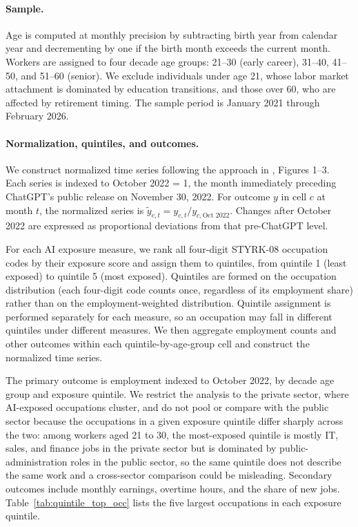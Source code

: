 \documentclass[12pt]{article}
\begin{document}
\paragraph{Sample.}
Age is computed at monthly precision by subtracting birth year from calendar year and decrementing by one if the birth month exceeds the current month. Workers are assigned to four decade age groups: 21--30 (early career), 31--40, 41--50, and 51--60 (senior). We exclude individuals under age 21, whose labor market attachment is dominated by education transitions, and those over 60, who are affected by retirement timing. The sample period is January 2021 through February 2026.

\paragraph{Normalization, quintiles, and outcomes.}\label{sec:data:approach}

We construct normalized time series following the approach in \citet{brynjolfsson2025}, Figures 1--3. Each series is indexed to October 2022 = 1, the month immediately preceding ChatGPT's public release on November 30, 2022. For outcome $y$ in cell $c$ at month $t$, the normalized series is $\tilde{y}_{c,t} = y_{c,t} / y_{c,\text{Oct } 2022}$. Changes after October 2022 are expressed as proportional deviations from that pre-ChatGPT level.

For each AI exposure measure, we rank all four-digit STYRK-08 occupation codes by their exposure score and assign them to quintiles, from quintile 1 (least exposed) to quintile 5 (most exposed). Quintiles are formed on the occupation distribution (each four-digit code counts once, regardless of its employment share) rather than on the employment-weighted distribution. Quintile assignment is performed separately for each measure, so an occupation may fall in different quintiles under different measures. We then aggregate employment counts and other outcomes within each quintile-by-age-group cell and construct the normalized time series.

The primary outcome is employment indexed to October 2022, by decade age group and exposure quintile. We restrict the analysis to the private sector, where AI-exposed occupations cluster, and do not pool or compare with the public sector because the occupations in a given exposure quintile differ sharply across the two: among workers aged 21 to 30, the most-exposed quintile is mostly IT, sales, and finance jobs in the private sector but is dominated by public-administration roles in the public sector, so the same quintile does not describe the same work and a cross-sector comparison could be misleading. Secondary outcomes include monthly earnings, overtime hours, and the share of new jobs. Table~\ref{tab:quintile_top_occ} lists the five largest occupations in each exposure quintile.
\end{document}
